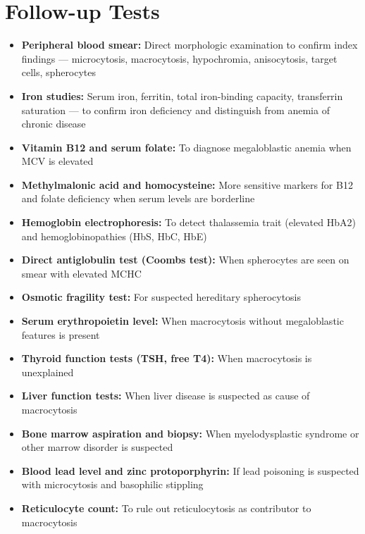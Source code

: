 \section*{Follow-up Tests}
\begin{itemize}
  \item \textbf{Peripheral blood smear:} Direct morphologic examination to confirm index findings --- microcytosis, macrocytosis, hypochromia, anisocytosis, target cells, spherocytes
  \item \textbf{Iron studies:} Serum iron, ferritin, total iron-binding capacity, transferrin saturation --- to confirm iron deficiency and distinguish from anemia of chronic disease
  \item \textbf{Vitamin B12 and serum folate:} To diagnose megaloblastic anemia when MCV is elevated
  \item \textbf{Methylmalonic acid and homocysteine:} More sensitive markers for B12 and folate deficiency when serum levels are borderline
  \item \textbf{Hemoglobin electrophoresis:} To detect thalassemia trait (elevated HbA2) and hemoglobinopathies (HbS, HbC, HbE)
  \item \textbf{Direct antiglobulin test (Coombs test):} When spherocytes are seen on smear with elevated MCHC
  \item \textbf{Osmotic fragility test:} For suspected hereditary spherocytosis
  \item \textbf{Serum erythropoietin level:} When macrocytosis without megaloblastic features is present
  \item \textbf{Thyroid function tests (TSH, free T4):} When macrocytosis is unexplained
  \item \textbf{Liver function tests:} When liver disease is suspected as cause of macrocytosis
  \item \textbf{Bone marrow aspiration and biopsy:} When myelodysplastic syndrome or other marrow disorder is suspected
  \item \textbf{Blood lead level and zinc protoporphyrin:} If lead poisoning is suspected with microcytosis and basophilic stippling
  \item \textbf{Reticulocyte count:} To rule out reticulocytosis as contributor to macrocytosis
\end{itemize}

